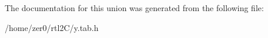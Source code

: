 The documentation for this union was generated from the following file\+:\begin{DoxyCompactItemize}
\item 
/home/zer0/rtl2\+C/y.\+tab.\+h\end{DoxyCompactItemize}
